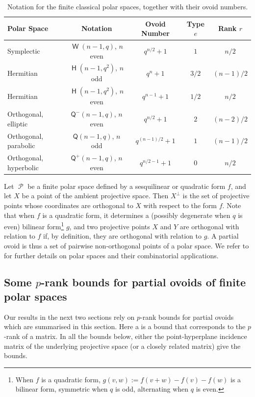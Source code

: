 \documentclass[a4paper,11pt]{amsproc}
\theoremstyle{plain}
\theoremstyle{definition}
\newcommand{\<}{\langle}
\renewcommand{\>}{\rangle} %
\DeclareMathOperator\p{\mathcal{P}}
\DeclareMathOperator\h{\mathsf{H}}
\DeclareMathOperator\w{\mathsf{W}}
\begin{document}
\begin{table}[H]
\caption{Notation for the finite classical polar spaces, together with their ovoid numbers.}\label{table:overview}
\begin{tabular}{lcccc}
\toprule
Polar Space&Notation&Ovoid Number& Type $e$ & Rank $r$\\
\midrule
Symplectic&$\w(n-1,q)$, $n$ even&$q^{n/2}+1$ & $1$ & $n/2$\\
Hermitian&$\h(n-1,q^2)$, $n$ odd&$q^{n}+1$ & $3/2$ & $(n - 1)/2$\\
Hermitian&$\h(n-1,q^2)$, $n$ even&$q^{n-1}+1$ & $1/2$ & $n/2$\\
Orthogonal, elliptic&$\mathsf{Q}^-(n-1,q)$, $n$ even&$q^{n/2}+1$ & $2$ & $(n - 2)/2$\\
Orthogonal, parabolic&$\mathsf{Q}(n-1,q)$, $n$ odd&$q^{(n-1)/2}+1$ & $1$ & $(n - 1)/2$\\
Orthogonal, hyperbolic&$\mathsf{Q}^+(n-1,q)$, $n$ even&$q^{n/2-1}+1$ & $0$ & $n/2$\\
\bottomrule
\end{tabular}
\end{table}

Let $\p$ be a finite polar space defined by a sesquilinear or quadratic form $f$, and let $X$ be a
point of the ambient projective space. Then $X^\perp$ is the set of projective points whose
coordinates are orthogonal to $X$ with respect to the form $f$. Note that when $f$ is a quadratic
form, it determines a (possibly degenerate when $q$ is even) bilinear form\footnote{When $f$ is a
quadratic form, $g(v,w) := f(v+w)-f(v)-f(w)$ is a bilinear form, symmetric when $q$ is odd, alternating when $q$ is even.} $g$, and two projective points
$X$ and $Y$ are orthogonal with relation to $f$ if, by definition, they are orthogonal with relation
to $g$.
A partial ovoid is thus a set of pairwise non-orthogonal points of a polar space. 
We refer to \cite{Hirschfeld1991} for further details on polar spaces and their combinatorial applications. 


\subsection{Some \texorpdfstring{$p$}{p}-rank bounds for partial ovoids of finite polar spaces}\label{sec:pranks}

Our results in the next two sections rely on $p$-rank bounds for partial ovoids
which are summarised in this section. Here a  is a bound that
corresponds to the $p$-rank of a matrix. In all the bounds below, either the point-hyperplane
incidence matrix of the underlying projective space (or a closely related matrix) give the bounds.
\end{document}
